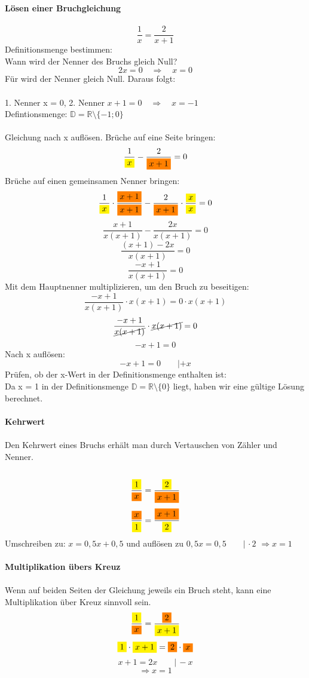 \documentclass[10pt,landscape]{article}
\begin{document}
\begin{multicols}{3}
    \textbf{Lösen einer Bruchgleichung}\\~\\
    \[\frac{1}{x} = \frac{2}{x+1}\]
    Definitionsmenge bestimmen: \\
    Wann wird der Nenner des Bruchs gleich Null?
    \[2x = 0 \quad \Rightarrow \quad x = 0\]
    Für wird der Nenner gleich Null. Daraus folgt: \\~\\
    1. Nenner x = 0, 2. Nenner $x + 1 = 0 \quad \Rightarrow \quad x = -1$ \\
    Defintionsmenge: $\mathbb{D} = \mathbb{R} \setminus \{-1; 0\}$ \\~\\
    Gleichung nach x auflösen. Brüche auf eine Seite bringen:
    \[\frac{1}{{\colorbox{yellow}{$x$}}} - \frac{2}{{\colorbox{orange}{$x+1$}}} = 0\]
    Brüche auf einen gemeinsamen Nenner bringen:
    \[\frac{1}{{\colorbox{yellow}{$x$}}} \cdot \frac{{\colorbox{orange}{$x+1$}}}{{\colorbox{orange}{$x+1$}}} - \frac{2}{{\colorbox{orange}{$x+1$}}} \cdot \frac{{\colorbox{yellow}{$x$}}}{{\colorbox{yellow}{$x$}}} = 0\]
    \[\frac{x+1}{x(x+1)} - \frac{2x}{x(x+1)}= 0\]
    \[\frac{(x+1) - 2x}{x(x+1)} = 0\]
    \[\frac{-x + 1}{x(x+1)} = 0\]
    Mit dem Hauptnenner multiplizieren, um den Bruch zu beseitigen:\\
    \[\frac{-x + 1}{x(x+1)} \cdot x(x+1) = 0 \cdot x(x+1)\]
    \[\frac{-x + 1}{\cancel{x(x+1)}} \cdot \cancel{x(x+1)} = 0\]
    \[-x + 1 = 0\]
    Nach x auflösen:
    \[-x + 1 = 0 \qquad |+x\]
    Prüfen, ob der x-Wert in der Definitionsmenge enthalten ist:\\
    Da x = 1 in der Definitionsmenge $\mathbb{D} = \mathbb{R} \setminus \{0\}$ liegt, haben wir eine gültige Lösung berechnet. \\~\\
    \textbf{Kehrwert}\\~\\
    Den Kehrwert eines Bruchs erhält man durch Vertauschen von Zähler und Nenner.\\~\\
    \[\frac{{\colorbox{yellow}{$1$}}}{{\colorbox{orange}{$x$}}} = \frac{{\colorbox{yellow}{$2$}}}{{\colorbox{orange}{$x+1$}}}\]
    \[\frac{{\colorbox{orange}{$x$}}}{{\colorbox{yellow}{$1$}}} = \frac{{\colorbox{orange}{$x+1$}}}{{\colorbox{yellow}{$2$}}}\]
    Umschreiben zu: $x = 0{,}5x + 0{,}5$ und auflösen zu $0{,}5x = 0{,}5 \qquad |\, \cdot 2$ $\Rightarrow x = 1$ \\~\\
    \textbf{Multiplikation übers Kreuz}\\~\\
    Wenn auf beiden Seiten der Gleichung jeweils ein Bruch steht, kann eine Multiplikation über Kreuz sinnvoll sein.
    \[\frac{{\colorbox{yellow}{$1$}}}{{\colorbox{orange}{$x$}}} = \frac{{\colorbox{orange}{$2$}}}{{\colorbox{yellow}{$x+1$}}}\]
    \[{\colorbox{yellow}{$1$}} \cdot {\colorbox{yellow}{$x+1$}} = {\colorbox{orange}{$2$}} \cdot {\colorbox{orange}{$x$}}\]
    \[x+1 = 2x \qquad |\, -x\]
    \[\Rightarrow x = 1\]

\end{multicols}
\end{document}
